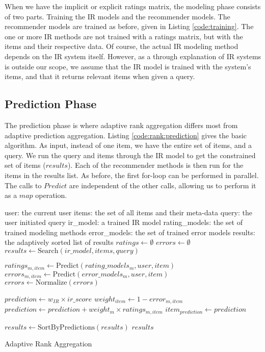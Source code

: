 When we have the implicit or explicit ratings matrix, the modeling phase
consists of two parts. Training the IR models and the recommender models.
The recommender models are trained as before, given in Listing \ref{code:training}.
The one or more IR methods are not trained with a ratings matrix,
but with the items and their respective data.
Of course, the actual IR modeling method depends on the IR system itself.
However, as a through explanation of IR systems is outside our scope,
we assume that the IR model is trained with the system's items,
and that it returns relevant items when given a query.


\clearpage
\subsection{Prediction Phase}

The prediction phase is where adaptive rank aggregation differs most from adaptive prediction aggregation.
Listing \ref{code:rank:prediction} gives the basic algorithm.
As input, instead of one item, we have the entire set of items, and a query.
We run the query and items through the IR model to get the constrained set of items ($results$).
Each of the recommender methods is then run for the items in the results list.
As before, the first for-loop can be performed in parallel.
The calls to $Predict$ are independent of the other calls,
allowing us to perform it as a $map$ operation.

\begin{algorithm}[t]
  \begin{algorithmic}[1]
  \REQUIRE user: the current user
  \REQUIRE items: the set of all items and their meta-data
  \REQUIRE query: the user initiated query
  \REQUIRE ir\_model: a trained IR model
  \REQUIRE rating\_models: the set of trained modeling methods 
  \REQUIRE error\_models: the set of trained error models
  \ENSURE  results: the adaptively sorted list of results
    \STATE $ratings \gets \emptyset$
    \STATE $errors  \gets \emptyset$
    \STATE $results \gets \mathrm{Search}(ir\_model, items, query)$
    
        \STATE $ratings_{m,item} \gets \mathrm{Predict}(rating\_models_m, user, item)$
        \STATE $errors_{m,item}  \gets \mathrm{Predict}(error\_models_m, user, item)$
      \ENDFOR 
    \ENDFOR
    \STATE $errors \gets \mathrm{Normalize}(errors)$

      \STATE $prediction \gets w_{IR} \times ir\_score$
        \STATE $weight_{item} \gets 1 - error_{m,item}$
        \STATE $prediction \gets prediction + weight_m \times ratings_{m,item}$
      \ENDFOR
      \STATE $item_{prediction} \gets prediction$
    \ENDFOR
    
    \STATE $results \gets \mathrm{SortByPredictions}(results)$
  \RETURN $results$

  \end{algorithmic}
  \caption[Adaptive Rank Aggregation]{Adaptive Rank Aggregation}
  \label{code:rank:prediction}
\end{algorithm}

